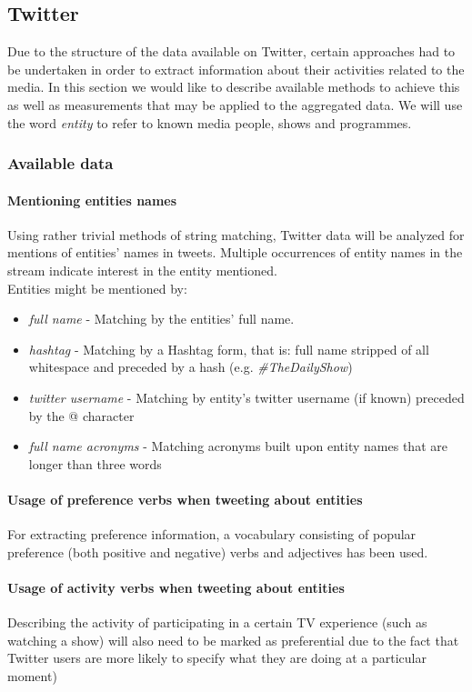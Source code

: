 \newpage
\subsection{Twitter}

Due to the structure of the data available on Twitter, certain approaches had to be undertaken in order to
extract information about their activities related to the media. In this section we would like to describe
available methods to achieve this as well as measurements that may be applied to the aggregated data.
We will use the word \textit{entity} to refer to known media people, shows and programmes.

\subsubsection{Available data}
\paragraph{Mentioning entities names}
Using rather trivial methods of string matching, Twitter data will be analyzed for
mentions of entities' names in tweets. Multiple occurrences of entity names in the
stream indicate interest in the entity mentioned. \\
Entities might be mentioned by:
\begin{itemize}
  \item \textit{full name} - Matching by the entities' full name.
  \item \textit{hashtag} - Matching by a Hashtag form, that is: full name stripped of all whitespace and preceded by a hash (e.g. \textit{\#TheDailyShow})
  \item \textit{twitter username} - Matching by entity's twitter username (if known) preceded by the @ character
  \item \textit{full name acronyms} - Matching acronyms built upon entity names that are longer than three words
\end{itemize}
\paragraph{Usage of preference verbs when tweeting about entities}
For extracting preference information, a vocabulary consisting of
popular preference (both positive and negative) verbs and adjectives has been used.
\paragraph{Usage of activity verbs when tweeting about entities}
Describing the activity of participating in a certain TV experience (such
as watching a show) will also need to be marked as preferential due to the
fact that Twitter users are more likely to specify what they are doing at a
particular moment)
